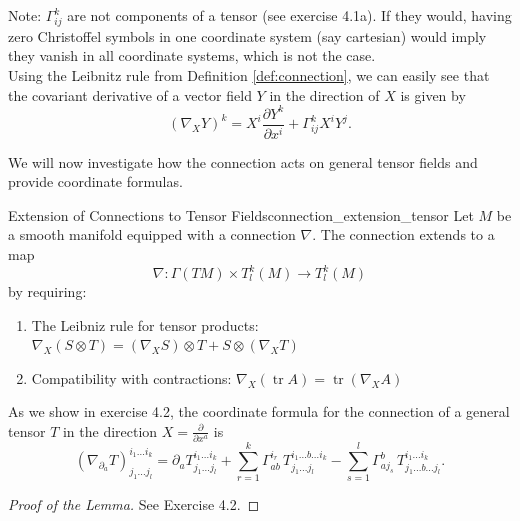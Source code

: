 Note: $\Gamma_{ij}^k$ are not components of a tensor (see exercise 4.1a). If they would, having zero Christoffel symbols in one coordinate system (say cartesian) would imply they vanish in all coordinate systems, which is not the case.\\

Using the Leibnitz rule from Definition \ref{def:connection}, we can easily see that the covariant derivative of a vector field $Y$ in the direction of $X$ is given by
\begin{equation}
    \label{eq:covariant_derivative_coordinates}
    (\nabla_X Y)^k = X^i \frac{\partial Y^k}{\partial x^i} + \Gamma_{ij}^k X^i Y^j.
\end{equation}

We will now investigate how the connection acts on general tensor fields and provide coordinate formulas.

\begin{colorlem}{Extension of Connections to Tensor Fields}{connection_extension_tensor}
Let $M$ be a smooth manifold equipped with a connection $\nabla$. The connection extends to a map
\[
\nabla: \Gamma(TM) \times T^k_l(M) \longrightarrow T^k_l(M)
\]
by requiring:
\begin{enumerate}
    \item The Leibniz rule for tensor products: $\nabla_X(S \otimes T) = (\nabla_X S) \otimes T + S \otimes (\nabla_X T)$
    \item Compatibility with contractions: $\nabla_X(\operatorname{tr} A) = \operatorname{tr}(\nabla_X A)$
\end{enumerate}
\end{colorlem}

As we show in exercise 4.2, the coordinate formula for the connection of a general tensor $T$ in the direction $X=\frac{\partial}{\partial x^a}$ is
\begin{equation}
    \label{eq:covariant_derivative_tensor_coordinates}
    (\nabla_{\partial_a} T)^{i_1 \dots i_k}_{j_1 \dots j_l}
= \partial_a T^{i_1 \dots i_k}_{j_1 \dots j_l}
+ \sum_{r=1}^{k} \Gamma^{i_r}_{a b} \, T^{i_1 \dots b \dots i_k}_{j_1 \dots j_l}
- \sum_{s=1}^{l} \Gamma^{b}_{a j_s} \, T^{i_1 \dots i_k}_{j_1 \dots b \dots j_l}.
\end{equation}


\begin{proof}[Proof of the Lemma]




See Exercise 4.2.
\end{proof}


